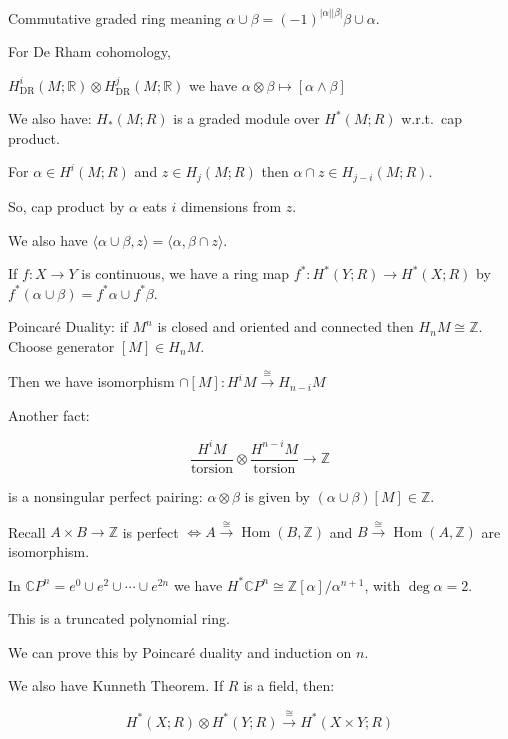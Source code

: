 \documentclass{article}
\theoremstyle{definition}
\begin{document}
    Commutative graded ring meaning \(\alpha \cup \beta = (-1)^{\vert \alpha  \vert \vert \beta \vert} \beta \cup \alpha\).
    
    For De Rham cohomology,

    \(H^i_{\text{DR}}(M;\mathbb{R}) \otimes H^j_{\text{DR}}(M;\mathbb{R})\) we have \(\alpha  \otimes \beta  \mapsto [\alpha \wedge \beta]\) 

    We also have: \(H_{\ast} (M;R)\) is a graded module over \(H^{\ast} (M;R)\) w.r.t.\ cap product.

    For \(\alpha \in H^i(M;R)\) and \(z\in H_j(M;R)\) then \(\alpha \cap z \in H_{j-i}(M;R)\).

    So, cap product by \(\alpha\) eats \(i\) dimensions from \(z\).

    We also have \(\langle \alpha \cup \beta, z \rangle = \langle \alpha , \beta \cap z \rangle \).

    If \(f: X\to Y\) is continuous, we have a ring map \(f^{\ast} : H^{\ast} (Y;R) \to H^{\ast} (X;R)\) by \(f^{\ast} (\alpha \cup \beta) = f^{\ast} \alpha \cup f^{\ast} \beta\).

    Poincar\'e Duality: if \(M^n\) is closed and oriented and connected then \(H_n M \cong \mathbb{Z}\). Choose generator \([M] \in H_n M\).

    Then we have isomorphism \(\cap [M]: H^i M \xrightarrow{\cong} H_{n-i} M  \) 

    Another fact:

    \[
        \frac{H^i M}{\text{torsion}} \otimes \frac{H^{n-i} M}{\text{torsion}} \to \mathbb{Z}
    \]

    is a nonsingular perfect pairing: \(\alpha \otimes \beta\) is given by \((\alpha \cup \beta)[M] \in \mathbb{Z}\).

    Recall \(A \times B \to \mathbb{Z}\) is perfect \(\iff A \xrightarrow{\cong} \operatorname{Hom}(B,\mathbb{Z})\) and \(B \xrightarrow{\cong} \operatorname{Hom}(A,\mathbb{Z})\) are isomorphism.

    In \(\mathbb{C} P^n = e^0 \cup e^2 \cup \cdots \cup e^{2n}\) we have \(H^{\ast} \mathbb{C} P^n \cong \mathbb{Z} [\alpha] / \alpha^{n+1}\), with \(\deg \alpha = 2\).

    This is a truncated polynomial ring.

    We can prove this by Poincar\'e duality and induction on \(n\).

    We also have Kunneth Theorem. If \(R\) is a field, then:

    \[
        H^{\ast} (X;R) \otimes H^{\ast} (Y;R) \xrightarrow{\cong} H^{\ast}(X \times Y; R)
    \]
\end{document}
